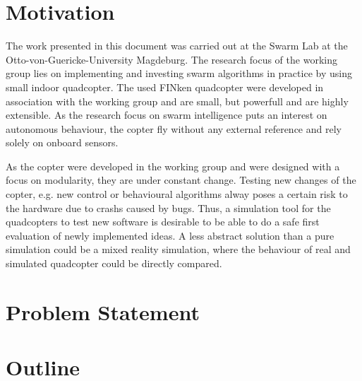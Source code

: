 

\section{Motivation}

The work presented in this document was carried out at the Swarm Lab at the Otto-von-Guericke-University Magdeburg. The research focus of the working group lies on implementing and investing swarm algorithms in practice by using small indoor quadcopter. The used FINken quadcopter were developed in association with the working group and are small, but powerfull and are highly extensible. As the research focus on swarm intelligence puts an interest on autonomous behaviour, the copter fly without any external reference and rely solely on onboard sensors.

As the copter were developed in the working group and were designed with a focus on modularity, they are under constant change. Testing new changes of the copter, e.g. new control or behavioural algorithms alway poses a certain risk to the hardware due to crashs caused by bugs. Thus, a simulation tool for the quadcopters to test new software is desirable to be able to do a safe first evaluation of newly implemented ideas. A less abstract solution than a pure simulation could be a mixed reality simulation, where the behaviour of real and simulated quadcopter could be directly compared.





       


  
\section{Problem Statement}
    
 
         
\section{Outline}
    
   